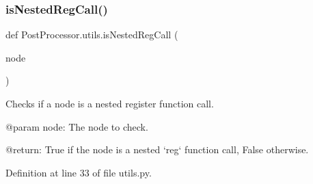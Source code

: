 \mbox{\label{namespacePostProcessor_1_1utils_a86292ec94138d20acb13a3c9c136a468}} 
\subsubsection{\texorpdfstring{is\+Nested\+Reg\+Call()}{isNestedRegCall()}}
{\footnotesize\ttfamily def Post\+Processor.\+utils.\+is\+Nested\+Reg\+Call (\begin{DoxyParamCaption}\item[{}]{node }\end{DoxyParamCaption})}

\begin{DoxyVerb}Checks if a node is a nested register function call.

@param node: The node to check.

@return: True if the node is a nested `reg` function call, False otherwise.
\end{DoxyVerb}
 

Definition at line 33 of file utils.\+py.



